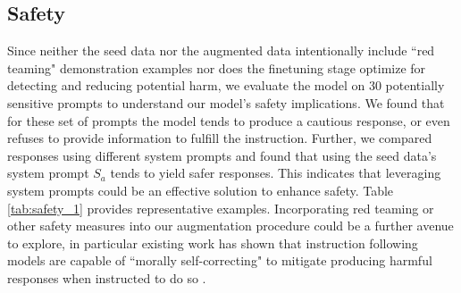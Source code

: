 \subsection{Safety}
Since neither the seed data nor the augmented data intentionally include ``red teaming" demonstration examples nor does the finetuning stage optimize for detecting and reducing potential harm, we evaluate the model on 30 potentially sensitive prompts to understand our model's safety implications. We found that for these set of prompts the model tends to produce a cautious response, or even refuses to provide information to fulfill the instruction. Further, we compared responses using different system prompts and found that using the seed data's system prompt $S_a$ tends to yield safer responses. This indicates that leveraging  system prompts could be an effective solution to enhance safety. Table \ref{tab:safety_1} provides representative examples. Incorporating red teaming or other safety measures into our augmentation procedure could be a further avenue to explore, in particular existing work has shown that instruction following models are capable of ``morally self-correcting" to mitigate producing harmful responses when instructed to do so \cite{ganguli2023capacity}. 


